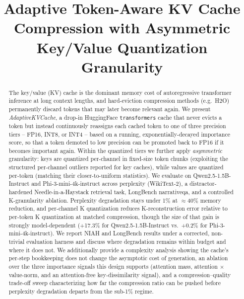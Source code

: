 \documentclass[conference]{IEEEtran}
\begin{document}
\title{Adaptive Token-Aware KV Cache Compression with Asymmetric Key/Value Quantization Granularity}

\author{
}

\maketitle

\begin{abstract}
The key/value (KV) cache is the dominant memory cost of autoregressive transformer
inference at long context lengths, and hard-eviction compression methods (e.g.\ H2O)
permanently discard tokens that may later become relevant again. We present
\textit{AdaptiveKVCache}, a drop-in HuggingFace \texttt{transformers} cache that never
evicts a token but instead continuously reassigns each cached token to one of three
precision tiers -- FP16, INT8, or INT4 -- based on a running, exponentially-decayed
importance score, so that a token demoted to low precision can be promoted back to FP16
if it becomes important again. Within the quantized tiers we further apply
\emph{asymmetric} granularity: keys are quantized per-channel in fixed-size token chunks
(exploiting the structured per-channel outliers reported for key caches), while values
are quantized per-token (matching their closer-to-uniform statistics). We evaluate on
Qwen2.5-1.5B-Instruct and Phi-3-mini-4k-instruct across perplexity (WikiText-2), a
distractor-hardened Needle-in-a-Haystack retrieval task, LongBench narrativeqa, and a
controlled K-granularity ablation. Perplexity degradation stays under 1\% at
$\approx$40\% memory reduction, and per-channel K quantization reduces K-reconstruction
error relative to per-token K quantization at matched compression, though the size of
that gain is strongly model-dependent (+17.3\% for Qwen2.5-1.5B-Instruct vs.\ +0.2\% for
Phi-3-mini-4k-instruct). We report NIAH and LongBench results under a corrected,
non-trivial evaluation harness and discuss where degradation remains within budget and
where it does not. We additionally provide a complexity analysis showing the cache's
per-step bookkeeping does not change the asymptotic cost of generation, an ablation
over the three importance signals this design supports (attention mass, attention
$\times$ value-norm, and an attention-free key-dissimilarity signal), and a
compression--quality trade-off sweep characterizing how far the compression ratio can be
pushed before perplexity degradation departs from the sub-1\% regime.
\end{abstract}
\end{document}
